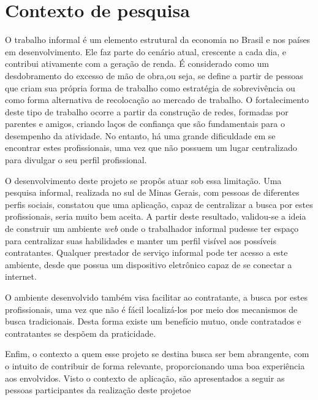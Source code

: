 \section{Contexto de pesquisa}
\par O trabalho informal é um elemento estrutural da economia no Brasil e nos países em desenvolvimento. Ele faz parte do cenário atual, crescente a cada dia, e contribui ativamente com a geração de renda. É considerado como um desdobramento do excesso de mão de obra,ou seja, se define a partir de pessoas que criam sua própria forma de trabalho como estratégia de sobrevivência ou como forma alternativa de recolocação ao mercado de trabalho. O fortalecimento deste tipo de trabalho ocorre a partir da construção de redes, formadas por parentes e amigos, criando laços de confiança que são fundamentais para o desempenho da atividade. No entanto, há uma grande dificuldade em se encontrar estes profissionais, uma vez que não possuem um lugar centralizado para divulgar o seu perfil profissional.
\par O desenvolvimento deste projeto se propôs atuar sob essa limitação. Uma pesquisa informal, realizada no sul de Minas Gerais, com pessoas de diferentes perfis sociais, constatou que uma aplicação, capaz de centralizar a busca por estes profissionais, seria muito bem aceita. A partir deste resultado, validou-se a ideia de construir um ambiente \textit{web} onde o trabalhador informal pudesse ter espaço para centralizar suas habilidades e manter um perfil visível aos possíveis contratantes. Qualquer prestador de serviço informal pode ter acesso a este ambiente, desde que possua um dispositivo eletrônico capaz de se conectar a internet. 
\par O ambiente desenvolvido também visa facilitar ao contratante, a busca por estes profissionais, uma vez que não é fácil localizá-los por meio dos mecanismos de busca tradicionais. Desta forma existe um benefício mutuo, onde contratados e contratantes se despõem da praticidade.
\par Enfim, o contexto a quem esse projeto se destina busca ser bem abrangente, com o intuito de contribuir de forma relevante, proporcionando uma boa experiência aos envolvidos. Visto o contexto de aplicação, são apresentados a seguir as pessoas participantes da realização deste projetoe
 


